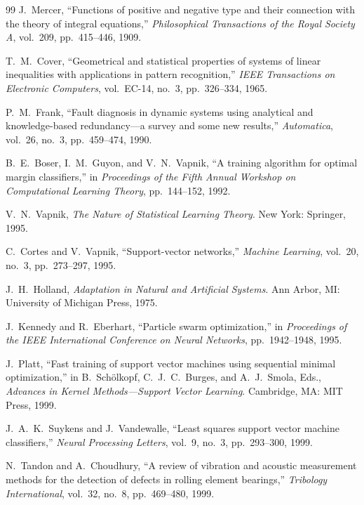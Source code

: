\begin{thebibliography}{99}
J.~Mercer,
``Functions of positive and negative type and their connection with the theory of integral equations,''
\textit{Philosophical Transactions of the Royal Society A}, vol.~209, pp.~415--446, 1909.

T.~M.~Cover,
``Geometrical and statistical properties of systems of linear inequalities with applications in pattern recognition,''
\textit{IEEE Transactions on Electronic Computers}, vol.~EC-14, no.~3, pp.~326--334, 1965.

P.~M.~Frank,
``Fault diagnosis in dynamic systems using analytical and knowledge-based redundancy---a survey and some new results,''
\textit{Automatica}, vol.~26, no.~3, pp.~459--474, 1990.

B.~E.~Boser, I.~M.~Guyon, and V.~N.~Vapnik,
``A training algorithm for optimal margin classifiers,''
in \textit{Proceedings of the Fifth Annual Workshop on Computational Learning Theory}, pp.~144--152, 1992.

V.~N.~Vapnik,
\textit{The Nature of Statistical Learning Theory}.
New York: Springer, 1995.

C.~Cortes and V.~Vapnik,
``Support-vector networks,''
\textit{Machine Learning}, vol.~20, no.~3, pp.~273--297, 1995.

J.~H.~Holland,
\textit{Adaptation in Natural and Artificial Systems}.
Ann Arbor, MI: University of Michigan Press, 1975.

J.~Kennedy and R.~Eberhart,
``Particle swarm optimization,''
in \textit{Proceedings of the IEEE International Conference on Neural Networks}, pp.~1942--1948, 1995.

J.~Platt,
``Fast training of support vector machines using sequential minimal optimization,''
in B.~Sch\"olkopf, C.~J.~C.~Burges, and A.~J.~Smola, Eds., \textit{Advances in Kernel Methods---Support Vector Learning}.
Cambridge, MA: MIT Press, 1999.

J.~A.~K.~Suykens and J.~Vandewalle,
``Least squares support vector machine classifiers,''
\textit{Neural Processing Letters}, vol.~9, no.~3, pp.~293--300, 1999.

N.~Tandon and A.~Choudhury,
``A review of vibration and acoustic measurement methods for the detection of defects in rolling element bearings,''
\textit{Tribology International}, vol.~32, no.~8, pp.~469--480, 1999.


\end{thebibliography}
